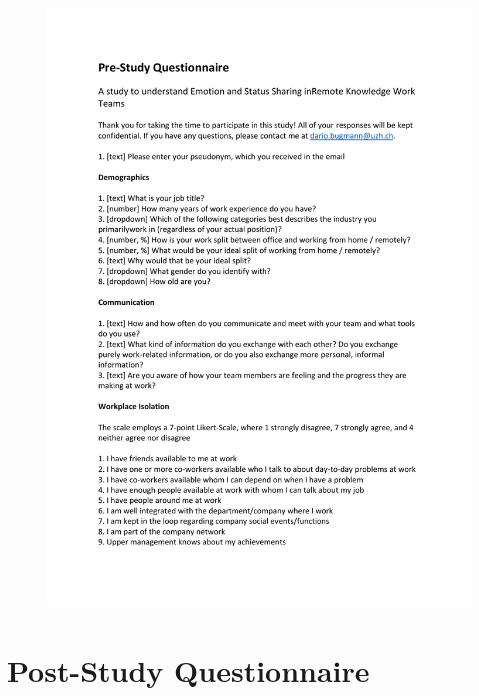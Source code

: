 \begin{figure}[h]
    \centering
    \includegraphics[width=\linewidth, page=2]{./documents/Prestudy_Questionnaire.pdf}
\end{figure}

\chapter{Post-Study Questionnaire}
\label{chapter:poststudy_questionnaire}

